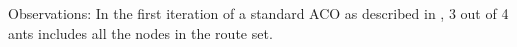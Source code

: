 Observations:
In the first iteration of a standard ACO as described in \citet{nanda11}, 3 out of 4 ants includes all the nodes in the route set. 
